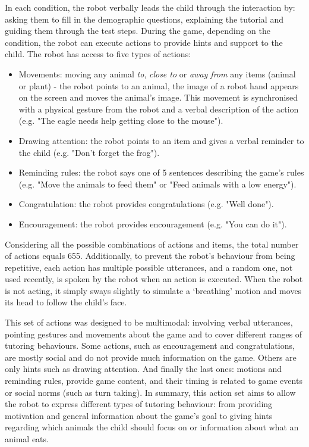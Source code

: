 In each condition, the robot verbally leads the child through the interaction by: asking them to fill in the demographic questions, explaining the tutorial and guiding them through the test steps. During the game, depending on the condition, the robot can execute actions to provide hints and support to the child. The robot has access to five types of actions:
\begin{itemize}
	\item Movements: moving any animal \emph{to}, \emph{close to} or \emph{away from} any items (animal or plant) - the robot points to an animal, the image of a robot hand appears on the screen and moves the animal's image. This movement is synchronised with a physical gesture from the robot and a verbal description of the action (e.g. "The eagle needs help getting close to the mouse").
	\item Drawing attention: the robot points to an item and gives a verbal reminder to the child (e.g. "Don't forget the frog").
	\item Reminding rules: the robot says one of 5 sentences describing the game's rules (e.g. "Move the animals to feed them" or "Feed animals with a low energy").
	\item Congratulation: the robot provides congratulations (e.g. "Well done").
	\item Encouragement: the robot provides encouragement (e.g. "You can do it").
\end{itemize}
Considering all the possible combinations of actions and items, the total number of actions equals 655. Additionally, to prevent the robot's behaviour from being repetitive, each action has multiple possible utterances, and a random one, not used recently, is spoken by the robot when an action is executed. When the robot is not acting, it simply sways slightly to simulate a `breathing' motion and moves its head to follow the child's face. 

This set of actions was designed to be multimodal: involving verbal utterances, pointing gestures and movements about the game and to cover different ranges of tutoring behaviours. Some actions, such as encouragement and congratulations, are mostly social and do not provide much information on the game. Others are only hints such as drawing attention. And finally the last ones: motions and reminding rules, provide game content, and their timing is related to game events or social norms (such as turn taking). In summary, this action set aims to allow the robot to express different types of tutoring behaviour: from providing motivation and general information about the game's goal to giving hints regarding which animals the child should focus on or information about what an animal eats. %

